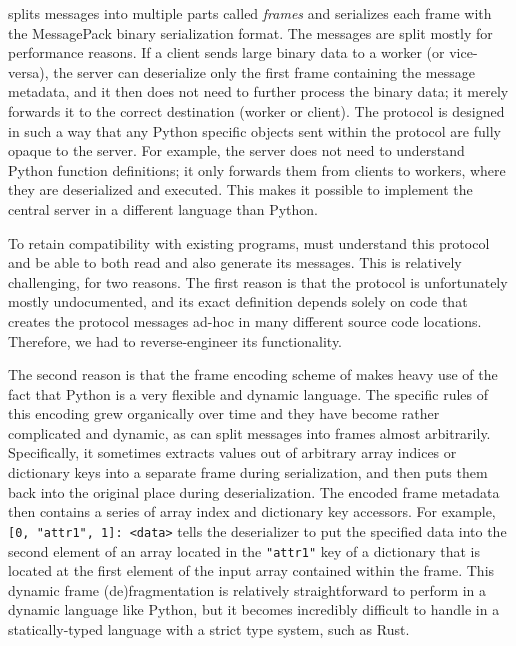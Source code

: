 \dask{} splits messages into multiple parts called \emph{frames}
and serializes each frame with the MessagePack binary serialization
format. The messages are split mostly for performance reasons. If a client sends large binary data
to a worker (or vice-versa), the server can deserialize only the first frame containing the message
metadata, and it then does not need to further process the binary data; it merely forwards it to
the correct destination (worker or client). The protocol is designed in such a way that any Python
specific objects sent within the protocol are fully opaque to the server. For example, the server
does not need to understand Python function definitions; it only forwards them from clients to
workers, where they are deserialized and executed. This makes it possible to implement the central
server in a different language than Python.

To retain compatibility with existing \dask{} programs,
\rsds{} must understand this protocol and be able to both read and also
generate its messages. This is relatively challenging, for two reasons. The first reason is that
the protocol is unfortunately mostly undocumented, and its exact
definition depends solely on \dask{} code that creates the protocol messages
ad-hoc in many different source code locations. Therefore, we had to reverse-engineer its
functionality.

The second reason is that the frame encoding scheme of \dask{} makes heavy use
of the fact that Python is a very flexible and dynamic language. The specific rules of this
encoding grew organically over time and they have become rather complicated and dynamic, as
\dask{} can split messages into frames almost arbitrarily. Specifically, it
sometimes extracts values out of arbitrary array indices or dictionary keys into a separate frame
during serialization, and then puts them back into the original place during deserialization. The
encoded frame metadata then contains a series of array index and dictionary key accessors. For
example, \verb|[0, "attr1", 1]: <data>| tells the deserializer to put the specified data into the
second element of an array located in the \texttt{"attr1"} key of a dictionary that is
located at the first element of the input array contained within the frame. This dynamic frame
(de)fragmentation is relatively straightforward to perform in a dynamic language like Python, but
it becomes incredibly difficult to handle in a statically-typed language with a strict type system,
such as Rust.

